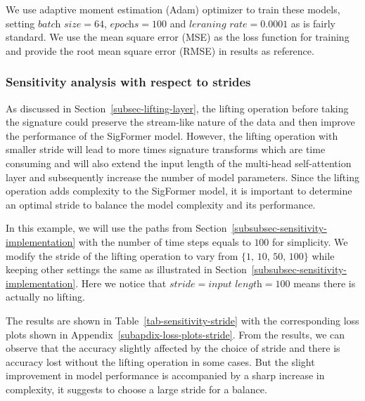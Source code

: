 \documentclass[]{article}
\renewcommand{\(}{\left(}
\renewcommand{\)}{\right)}
\begin{document}
	We use adaptive moment estimation (Adam) optimizer to train these models, setting $\textit{batch size}=64$, $\textit{epochs}=100$ and $\textit{leraning rate}=0.0001$ as is fairly standard. We use the mean square error (MSE) as the loss function for training and provide the root mean square error (RMSE) in results as reference.
	
	
	\subsubsection{Sensitivity analysis with respect to strides}
	\label{subsubsec-sensitivity-stride}
	As discussed in Section~\ref{subsec-lifting-layer}, the lifting operation before taking the signature could preserve the stream-like nature of the data and then improve the performance of the SigFormer model. However, the lifting operation with smaller stride will lead to more times signature transforms which are time consuming and will also extend the input length of the multi-head self-attention layer and subsequently increase the number of model parameters. Since the lifting operation adds complexity to the SigFormer model, it is important to determine an optimal stride to balance the model complexity and its performance. 
	
	In this example, we will use the paths from Section~\ref{subsubsec-sensitivity-implementation} with the number of time steps equals to $100$ for simplicity. We modify the stride of the lifting operation to vary from $\{1,\,10,\,50,\,100\}$ while keeping other settings the same as illustrated in Section~\ref{subsubsec-sensitivity-implementation}. Here we notice that $\textit{stride}=\textit{input length}=100$ means there is actually no lifting.
	
	The results are shown in Table~\ref{tab-sensitivity-stride} with the corresponding loss plots shown in Appendix~\ref{subapdix-loss-plots-stride}. From the results, we can observe that the accuracy slightly affected by the choice of stride and there is accuracy lost without the lifting operation in some cases. But the slight improvement in model performance is accompanied by a sharp increase in complexity, it suggests to choose a large stride for a balance.
	 
\end{document}
